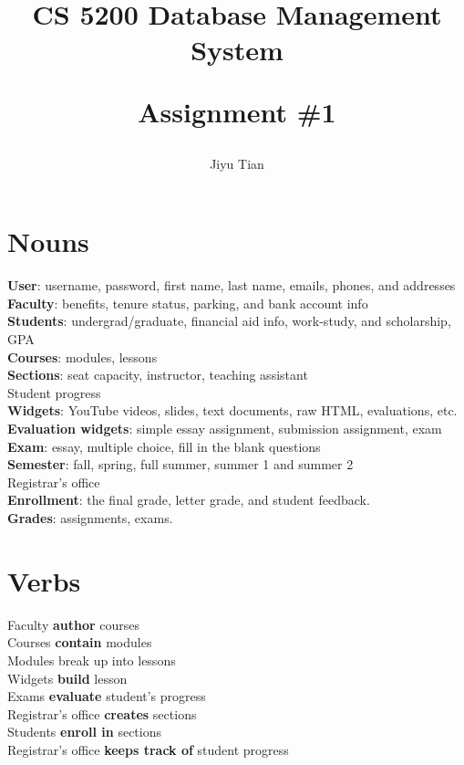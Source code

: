 \documentclass[12pt]{article}
\title{CS 5200 Database Management System\\ [2ex] \begin{large} Assignment \#1 \end{large} }
\author{Jiyu Tian}
\date{}
\begin{document}
\maketitle
\section{Nouns}
\textbf{User}: username, password, first name, last name, emails, phones, and addresses\\
\textbf{Faculty}: benefits, tenure status, parking, and bank account info\\
\textbf{Students}: undergrad/graduate, financial aid info, work-study, and scholarship, GPA\\
\textbf{Courses}: modules, lessons\\
\textbf{Sections}: seat capacity, instructor, teaching assistant\\
Student progress\\
\textbf{Widgets}: YouTube videos, slides, text documents, raw HTML, evaluations, etc.\\
\textbf{Evaluation widgets}: simple essay assignment, submission assignment, exam\\
\textbf{Exam}: essay, multiple choice, fill in the blank questions\\
\textbf{Semester}: fall, spring, full summer, summer 1 and summer 2\\
Registrar's office\\
\textbf{Enrollment}: the final grade, letter grade, and student feedback.\\
\textbf{Grades}: assignments, exams. 
\section{Verbs}
Faculty \textbf{author} courses\\
Courses \textbf{contain} modules\\
Modules break up into lessons\\
Widgets \textbf{build} lesson\\
Exams \textbf{evaluate} student's progress\\
Registrar's office \textbf{creates} sections\\
Students \textbf{enroll in} sections\\
Registrar's office \textbf{keeps track of} student progress\\
\end{document}

